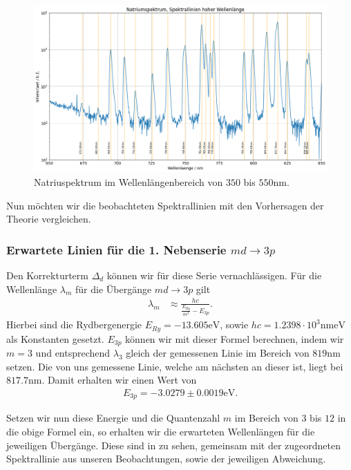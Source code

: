 \begin{figure}[H]
  \centering
  \includegraphics[width=.9\textwidth]{files/plots/na_spek_650_850.png}
  \caption{Natriuspektrum im Wellenlängenbereich von $350$ bis $550\si{\nano\meter}$.}
  \label{fig:na_spek_650_850}
\end{figure}

Nun möchten wir die beobachteten Spektrallinien mit den Vorhersagen der Theorie vergleichen.

\subsubsection*{Erwartete Linien für die 1. Nebenserie $md \to 3p$}

Den Korrekturterm $\Delta_{d}$ können wir für diese Serie vernachlässigen. Für die Wellenlänge $\lambda_m$ für die Übergänge $md \to 3p$ gilt
\begin{align}
  \lambda_m &\approx \frac{hc}{\frac{E_{Ry}}{m^2} - E_{3p}}.
\end{align}
Hierbei sind die Rydbergenergie $E_{Ry} = -13.605\unit{\electronvolt}$, sowie $hc = 1.2398 \cdot 10^{3} \si{\nano\meter \electronvolt}$ als Konstanten gesetzt. $E_{3p}$ können wir mit dieser Formel berechnen, indem wir $m = 3$ und entsprechend $\lambda_3$ gleich der gemessenen Linie im Bereich von $819\si{\nano\meter}$ setzen. Die von uns gemessene Linie, welche am nächsten an dieser ist, liegt bei $817.7\si{\nano\meter}$. Damit erhalten wir einen Wert von
\begin{align}
  E_{3p} = -3.0279 \pm 0.0019\si{\electronvolt}.
\end{align}

Setzen wir nun diese Energie und die Quantenzahl $m$ im Bereich von $3$ bis $12$ in die obige Formel ein, so erhalten wir die erwarteten Wellenlängen für die jeweiligen Übergänge. Diese sind in  zu sehen, gemeinsam mit der zugeordneten Spektrallinie aus unseren Beobachtungen, sowie der jeweiligen Abweichung.

